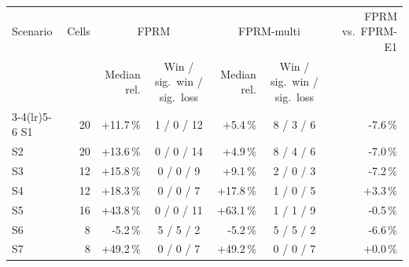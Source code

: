 \begin{tabular}{lrrcrcr}
\toprule
Scenario & Cells & \multicolumn{2}{c}{FPRM} & \multicolumn{2}{c}{FPRM-multi} & FPRM vs.\ FPRM-E1 \\
 & & Median rel. & Win / sig.\ win / sig.\ loss & Median rel. & Win / sig.\ win / sig.\ loss & \\
\cmidrule(lr){3-4}\cmidrule(lr){5-6}
\midrule
S1 & 20 & +11.7\,\% & 1 / 0 / 12 & +5.4\,\% & 8 / 3 / 6 & -7.6\,\% \\
S2 & 20 & +13.6\,\% & 0 / 0 / 14 & +4.9\,\% & 8 / 4 / 6 & -7.0\,\% \\
S3 & 12 & +15.8\,\% & 0 / 0 / 9 & +9.1\,\% & 2 / 0 / 3 & -7.2\,\% \\
S4 & 12 & +18.3\,\% & 0 / 0 / 7 & +17.8\,\% & 1 / 0 / 5 & +3.3\,\% \\
S5 & 16 & +43.8\,\% & 0 / 0 / 11 & +63.1\,\% & 1 / 1 / 9 & -0.5\,\% \\
S6 & 8 & -5.2\,\% & 5 / 5 / 2 & -5.2\,\% & 5 / 5 / 2 & -6.6\,\% \\
S7 & 8 & +49.2\,\% & 0 / 0 / 7 & +49.2\,\% & 0 / 0 / 7 & +0.0\,\% \\
\bottomrule
\end{tabular}

